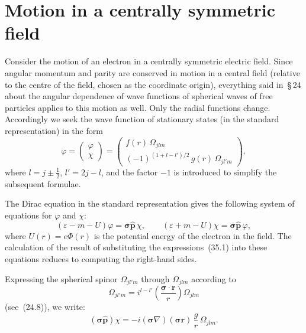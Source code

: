 \section{Motion in a centrally symmetric field}

Consider the motion of an electron in a centrally symmetric electric field. Since angular momentum and parity are conserved in motion in a central field (relative to the centre of the field, chosen as the coordinate origin), everything said in~\S\,24 about the angular dependence of wave functions of spherical waves of free particles applies to this motion as well. Only the radial functions change. Accordingly we seek the wave function of stationary states (in the standard representation) in the form
\begin{equation}
\varphi = \begin{pmatrix} \varphi \\ \chi \end{pmatrix}
= \begin{pmatrix} f(r)\,\Omega_{jlm} \\[4pt] (-1)^{(1+l-l')/2}\,g(r)\,\Omega_{jl'm} \end{pmatrix},
\tag{35.1}
\end{equation}
where $l = j \pm \tfrac{1}{2}$, $l' = 2j - l$, and the factor $-1$ is introduced to simplify the subsequent formulae.

The Dirac equation in the standard representation gives the following system of equations for $\varphi$ and $\chi$:
\begin{equation}
(\varepsilon - m - U)\varphi = \boldsymbol{\sigma}\widehat{\mathbf{p}}\,\chi,\qquad
(\varepsilon + m - U)\chi = \boldsymbol{\sigma}\widehat{\mathbf{p}}\,\varphi,
\tag{35.2}
\end{equation}
where $U(r) = e\Phi(r)$ is the potential energy of the electron in the field. The calculation of the result of substituting the expressions~(35.1) into these equations reduces to computing the right-hand sides.

Expressing the spherical spinor $\Omega_{jl'm}$ through $\Omega_{jlm}$ according to
\[
\Omega_{jl'm} = i^{l-l'}\!\left(\frac{\boldsymbol{\sigma}\cdot\mathbf{r}}{r}\right)\!\Omega_{jlm}
\]
(see~(24.8)), we write:
\[
(\boldsymbol{\sigma}\widehat{\mathbf{p}})\chi = -i(\boldsymbol{\sigma}\nabla)(\boldsymbol{\sigma}\mathbf{r})\,\frac{g}{r}\,\Omega_{jlm}.
\]

